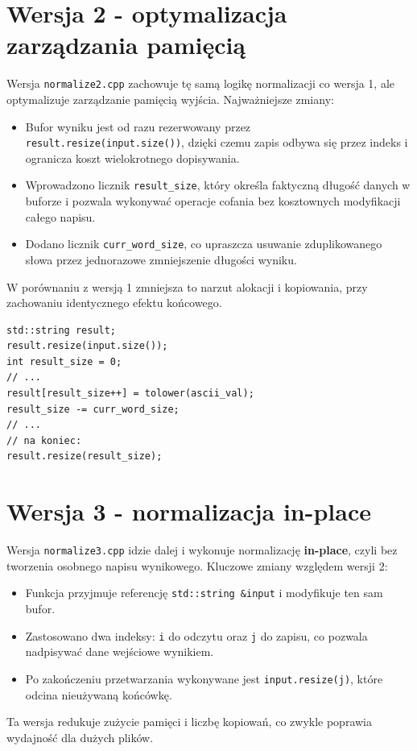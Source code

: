 \documentclass{article}
\begin{document}
\section{Wersja 2 - optymalizacja zarządzania pamięcią}
Wersja \texttt{normalize2.cpp} zachowuje tę samą logikę normalizacji co wersja 1, ale optymalizuje zarządzanie pamięcią wyjścia. Najważniejsze zmiany:
\begin{itemize}
    \item Bufor wyniku jest od razu rezerwowany przez \texttt{result.resize(input.size())}, dzięki czemu zapis odbywa się przez indeks i ogranicza koszt wielokrotnego dopisywania.
    \item Wprowadzono licznik \texttt{result\_size}, który określa faktyczną długość danych w buforze i pozwala wykonywać operacje cofania bez kosztownych modyfikacji całego napisu.
    \item Dodano licznik \texttt{curr\_word\_size}, co upraszcza usuwanie zduplikowanego słowa przez jednorazowe zmniejszenie długości wyniku.
\end{itemize}
W porównaniu z wersją 1 zmniejsza to narzut alokacji i kopiowania, przy zachowaniu identycznego efektu końcowego.

\begin{lstlisting}[caption={Fragment optymalizacji funkcji \texttt{normalize\_string} w wersji 2}]
std::string result;
result.resize(input.size()); 
int result_size = 0;
// ...
result[result_size++] = tolower(ascii_val);
result_size -= curr_word_size;
// ...
// na koniec:
result.resize(result_size);
\end{lstlisting}
\newpage
\section{Wersja 3 - normalizacja in-place}
Wersja \texttt{normalize3.cpp} idzie dalej i wykonuje normalizację \textbf{in-place}, czyli bez tworzenia osobnego napisu wynikowego. Kluczowe zmiany względem wersji 2:
\begin{itemize}
    \item Funkcja przyjmuje referencję \texttt{std::string \&input} i modyfikuje ten sam bufor.
    \item Zastosowano dwa indeksy: \texttt{i} do odczytu oraz \texttt{j} do zapisu, co pozwala nadpisywać dane wejściowe wynikiem.
    \item Po zakończeniu przetwarzania wykonywane jest \texttt{input.resize(j)}, które odcina nieużywaną końcówkę.
\end{itemize}
Ta wersja redukuje zużycie pamięci i liczbę kopiowań, co zwykle poprawia wydajność dla dużych plików.
\end{document}
